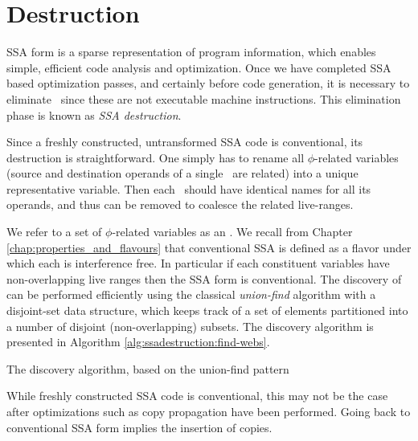 \section{Destruction}
\label{sec:classical_construction_algorithm:destruction}

SSA form is a 
sparse representation of program information,
which enables simple, efficient code analysis and optimization.
Once we have completed SSA based optimization passes,
and certainly before code generation,
it is necessary to eliminate \phiops\ since these
are not executable machine instructions.
This elimination phase is known as \textit{SSA destruction}. 

Since a freshly constructed, untransformed SSA code is conventional, its destruction is straightforward.
One simply has to rename all 
$\phi$-related variables (source and destination operands of
a single \phiop\ are related)
into a unique representative variable.
Then each \phiop\ should have identical names for all its operands,
and thus can be removed to coalesce the related live-ranges.

We refer to a set of $\phi$-related variables as
an \phiweb\index{\phiweb}. We recall from
Chapter \ref{chap:properties_and_flavours}
that conventional SSA is defined as a flavor under which each
\phiweb is interference free. In particular if each \phiwebs constituent
variables have non-overlapping live ranges then the SSA form is conventional.
The discovery of \phiwebs can be performed efficiently 
using the classical \textit{union-find} algorithm 
with a disjoint-set data structure,
which keeps track of a set of elements
partitioned into a number of disjoint (non-overlapping) subsets.
The \phiwebs discovery algorithm is presented in 
Algorithm \ref{alg:ssadestruction:find-webs}.

\begin{algorithm}
\caption{\label{alg:ssadestruction:find-webs}The \phiwebs discovery algorithm, based on the union-find pattern}
\end{algorithm}


While freshly constructed SSA code is conventional, 
this may not be the case after optimizations 
such as copy propagation have been performed.
Going back to conventional SSA form implies the insertion of copies.

